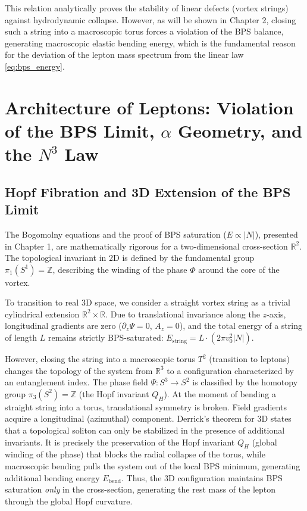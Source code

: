 \documentclass[11pt,a4paper]{article}
\begin{document}
This relation analytically proves the stability of linear defects (vortex strings) against hydrodynamic collapse. However, as will be shown in Chapter 2, closing such a string into a macroscopic torus forces a violation of the BPS balance, generating macroscopic elastic bending energy, which is the fundamental reason for the deviation of the lepton mass spectrum from the linear law \eqref{eq:bps_energy}.

\section{Architecture of Leptons: Violation of the BPS Limit, $\alpha$ Geometry, and the $N^3$ Law}

\subsection{Hopf Fibration and 3D Extension of the BPS Limit}
The Bogomolny equations and the proof of BPS saturation ($E \propto |N|$), presented in Chapter 1, are mathematically rigorous for a two-dimensional cross-section $\mathbb{R}^2$. The topological invariant in 2D is defined by the fundamental group $\pi_1(S^1) = \mathbb{Z}$, describing the winding of the phase $\Phi$ around the core of the vortex.

To transition to real 3D space, we consider a straight vortex string as a trivial cylindrical extension $\mathbb{R}^2 \times \mathbb{R}$. Due to translational invariance along the $z$-axis, longitudinal gradients are zero ($\partial_z \Psi = 0$, $A_z = 0$), and the total energy of a string of length $L$ remains strictly BPS-saturated: $E_{\text{string}} = L \cdot (2\pi v_0^2 |N|)$.

However, closing the string into a macroscopic torus $T^2$ (transition to leptons) changes the topology of the system from $\mathbb{R}^3$ to a configuration characterized by an entanglement index. The phase field $\Psi: S^3 \to S^2$ is classified by the homotopy group $\pi_3(S^2) = \mathbb{Z}$ (the Hopf invariant $Q_H$).
At the moment of bending a straight string into a torus, translational symmetry is broken. Field gradients acquire a longitudinal (azimuthal) component. Derrick's theorem for 3D states that a topological soliton can only be stabilized in the presence of additional invariants. It is precisely the preservation of the Hopf invariant $Q_H$ (global winding of the phase) that blocks the radial collapse of the torus, while macroscopic bending pulls the system out of the local BPS minimum, generating additional bending energy $E_{\text{bend}}$. Thus, the 3D configuration maintains BPS saturation \textit{only} in the cross-section, generating the rest mass of the lepton through the global Hopf curvature.
\end{document}

